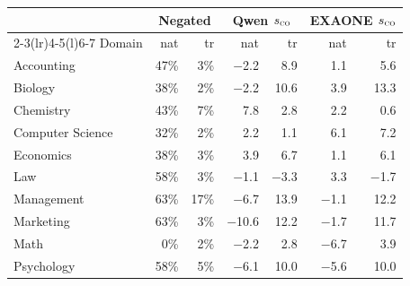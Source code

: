 \begin{tabular}{@{}lrrrrrr@{}}
\toprule
 & \multicolumn{2}{c}{Negated} & \multicolumn{2}{c}{Qwen $s_{\textsc{co}}$} & \multicolumn{2}{c}{EXAONE $s_{\textsc{co}}$} \\
\cmidrule(lr){2-3}\cmidrule(lr){4-5}\cmidrule(l){6-7}
Domain & nat & tr & nat & tr & nat & tr \\
\midrule
Accounting & 47\% & 3\% & $-$2.2 & 8.9 & 1.1 & 5.6 \\
Biology & 38\% & 2\% & $-$2.2 & 10.6 & 3.9 & 13.3 \\
Chemistry & 43\% & 7\% & 7.8 & 2.8 & 2.2 & 0.6 \\
Computer Science & 32\% & 2\% & 2.2 & 1.1 & 6.1 & 7.2 \\
Economics & 38\% & 3\% & 3.9 & 6.7 & 1.1 & 6.1 \\
Law & 58\% & 3\% & $-$1.1 & $-$3.3 & 3.3 & $-$1.7 \\
Management & 63\% & 17\% & $-$6.7 & 13.9 & $-$1.1 & 12.2 \\
Marketing & 63\% & 3\% & $-$10.6 & 12.2 & $-$1.7 & 11.7 \\
Math & 0\% & 2\% & $-$2.2 & 2.8 & $-$6.7 & 3.9 \\
Psychology & 58\% & 5\% & $-$6.1 & 10.0 & $-$5.6 & 10.0 \\
\bottomrule
\end{tabular}
